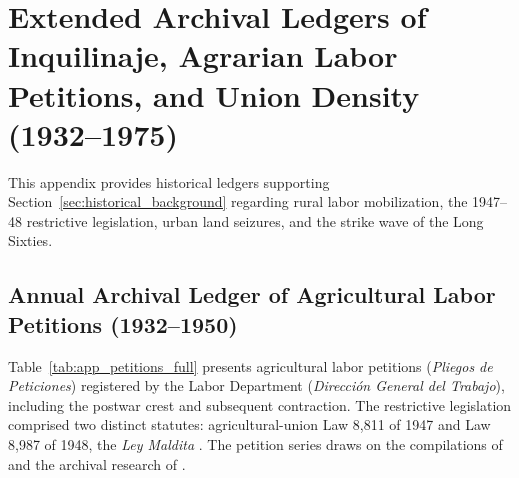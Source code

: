 \section{Extended Archival Ledgers of Inquilinaje, Agrarian Labor Petitions, and Union Density (1932--1975)}
\label{app:historical_labor_ledgers}

This appendix provides historical ledgers supporting Section~\ref{sec:historical_background} regarding rural labor mobilization, the 1947--48 restrictive legislation, urban land seizures, and the strike wave of the Long Sixties.

\subsection{Annual Archival Ledger of Agricultural Labor Petitions (1932--1950)}
\label{app:petitions_ledger}

Table~\ref{tab:app_petitions_full} presents agricultural labor petitions (\textit{Pliegos de Peticiones}) registered by the Labor Department (\textit{Dirección General del Trabajo}), including the postwar crest and subsequent contraction. The restrictive legislation comprised two distinct statutes: agricultural-union Law 8,811 of 1947 and Law 8,987 of 1948, the \textit{Ley Maldita} \citep{Chile1947,Chile1948}. The petition series draws on the compilations of \citet{MorrisOyaneder1962} and the archival research of \citet{Loveman1971,Loveman1976}.

